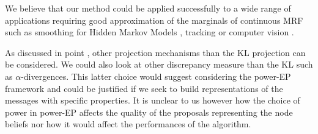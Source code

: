 We believe that our method could be applied successfully to a wide range of applications requiring good approximation of the marginals of continuous MRF such as smoothing for Hidden Markov Models \cite{briers10}, tracking or computer vision \cite{sudderth04,felzenszwalb04}. 


As discussed in point \label{point:epbp-proj}, other projection mechanisms than the KL projection can be considered. We could also look at other discrepancy measure than the KL such as $\alpha$-divergences. This latter choice would suggest considering the power-EP framework \citep{minka04} and could be justified if we seek to build representations of the messages with specific properties. It is unclear to us however how the choice of power in power-EP affects the quality of the proposals representing the node beliefs nor how it would affect the performances of the algorithm.



